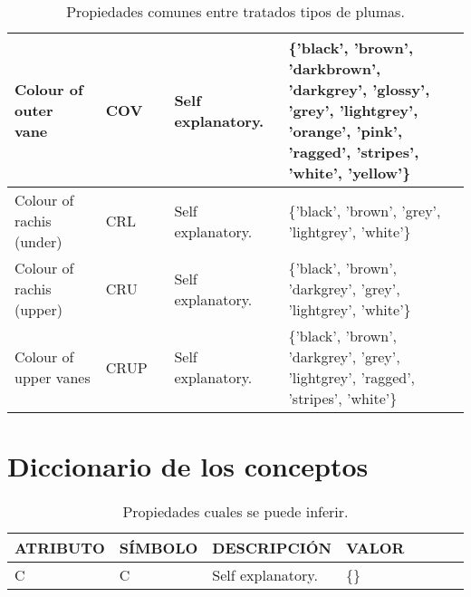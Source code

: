 \documentclass[a4paper,12pt]{article}
\begin{document}
\begin{table}[H]
\begin{tabular}{|p{0.2\linewidth}|p{0.15\linewidth}|p{0.25\linewidth}|p{0.4\linewidth}|}
		Colour of outer vane     & COV     & Self explanatory.                             & \{'black', 'brown', 'darkbrown', 'darkgrey', 'glossy', 'grey', 'lightgrey', 'orange', 'pink', 'ragged', 'stripes', 'white', 'yellow'\} \\ \hline
		Colour of rachis (under) & CRL     & Self explanatory.                             & \{'black', 'brown', 'grey', 'lightgrey', 'white'\}                                                                                     \\ \hline
		Colour of rachis (upper) & CRU     & Self explanatory.                             & \{'black', 'brown', 'darkgrey', 'grey', 'lightgrey', 'white'\}                                                                         \\ \hline
		Colour of upper vanes    & CRUP    & Self explanatory.                             & \{'black', 'brown', 'darkgrey', 'grey', 'lightgrey', 'ragged', 'stripes', 'white'\}                                                    \\ \hline
	\end{tabular}
	\caption{Propiedades comunes entre tratados tipos de plumas.}
\end{table}

\section{Diccionario de los conceptos}
\begin{table}[H]
	\centering
	\begin{tabular}{|p{0.2\linewidth}|p{0.15\linewidth}|p{0.25\linewidth}|p{0.4\linewidth}|}
		\hline
		ATRIBUTO & SÍMBOLO & DESCRIPCIÓN       & VALOR \\ \hline\hline
		C        & C       & Self explanatory. & \{\}  \\ \hline
	\end{tabular}
\caption{Propiedades cuales se puede inferir.}
\end{table}
\end{document}
